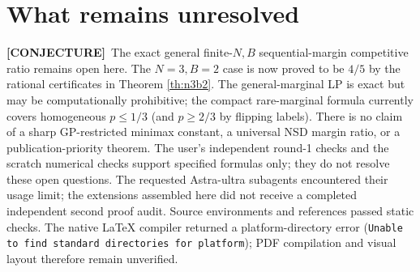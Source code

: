 \documentclass[11pt]{article}
\theoremstyle{definition}
\newcommand{\1}{\mathbf 1}
\newcommand{\cj}{\textbf{[CONJECTURE]}}
\begin{document}
\section{What remains unresolved}
\cj\ The exact general finite-$N,B$ sequential-margin competitive ratio
remains open here. The $N=3,B=2$ case is now proved to be $4/5$
by the rational certificates in Theorem \ref{th:n3b2}.
The general-marginal LP is exact but may be computationally prohibitive;
the compact rare-marginal formula currently covers homogeneous
$p\le1/3$ (and $p\ge2/3$ by flipping labels).
There is no claim of a sharp GP-restricted minimax constant, a universal NSD
margin ratio, or a publication-priority theorem.
The user's independent round-1 checks and the scratch numerical checks
support specified formulas only; they do not resolve these open questions.
The requested Astra-ultra subagents encountered their usage limit; the
extensions assembled here did not receive a completed independent second
proof audit. Source environments and references passed static checks.
The native LaTeX compiler returned a platform-directory error
(\texttt{Unable to find standard directories for platform}); PDF compilation
and visual layout therefore remain unverified.
\end{document}
